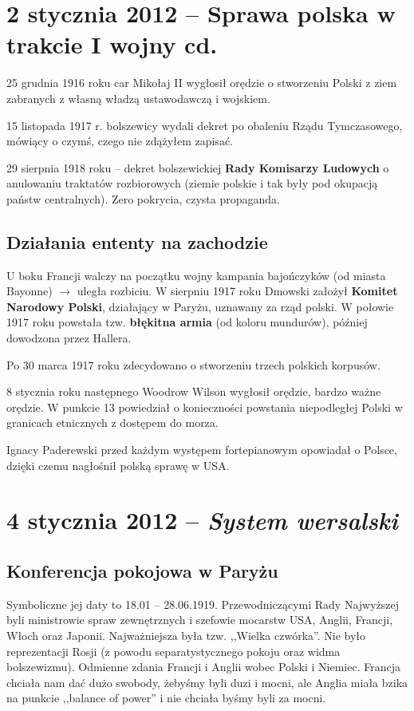 \documentclass [a4paper, 11pt, oneside]{book}
\begin{document}
\chapter{2 stycznia 2012 -- Sprawa polska w trakcie I wojny cd.} %
\label{cha:2_stycznia_2012_sprawa_polska_w_trakcie_i_wojny_cd_}
    25 grudnia 1916 roku car Mikołaj II wygłosił orędzie o stworzeniu Polski z ziem zabranych z własną władzą ustawodawczą i wojskiem.

    15 listopada 1917 r. bolszewicy wydali dekret po obaleniu Rządu Tymczasowego, mówiący o czymś, czego nie zdążyłem zapisać.

    29 sierpnia 1918 roku -- dekret bolszewickiej \textbf{Rady Komisarzy Ludowych} o anulowaniu traktatów rozbiorowych (ziemie polskie i tak były pod okupacją państw centralnych). Zero pokrycia, czysta propaganda.

    \section{Działania ententy na zachodzie} %
    \label{sec:dzia_ania_ententy_na_zachodzie}
        U boku Francji walczy na początku wojny kampania bajończyków (od miasta Bayonne) $\rightarrow$ uległa rozbiciu. W sierpniu 1917 roku Dmowski założył \textbf{Komitet Narodowy Polski}, działający w Paryżu, uznawany za rząd polski. W połowie 1917 roku powstała tzw. \textbf{błękitna armia} (od koloru mundurów), później dowodzona przez Hallera.

        Po 30 marca 1917 roku zdecydowano o stworzeniu trzech polskich korpusów.

        8 stycznia roku następnego Woodrow Wilson wygłosił orędzie, bardzo ważne orędzie. W punkcie 13 powiedział o konieczności powstania niepodległej Polski w granicach etnicznych z dostępem do morza.

        Ignacy Paderewski przed każdym występem fortepianowym opowiadał o Polsce, dzięki czemu nagłośnił polską sprawę w USA.
\chapter{4 stycznia 2012 -- \textit{System wersalski}} %
\label{cha:4_stycznia_2012_textit}
    \section{Konferencja pokojowa w Paryżu} %
    \label{sec:konferencja_pokojowa_w_pary_u}
        Symboliczne jej daty to 18.01 -- 28.06.1919. Przewodniczącymi Rady Najwyższej byli ministrowie spraw zewnętrznych i szefowie mocarstw USA, Anglii, Francji, Włoch oraz Japonii. Najważniejsza była tzw. ,,Wielka czwórka''. Nie było reprezentacji Rosji (z powodu separatystycznego pokoju oraz widma bolszewizmu). Odmienne zdania Francji i Anglii wobec Polski i Niemiec. Francja chciała nam dać dużo swobody, żebyśmy byli duzi i mocni, ale Anglia miała bzika na punkcie ,,balance of power'' i nie chciała byśmy byli za mocni.
\end{document}
